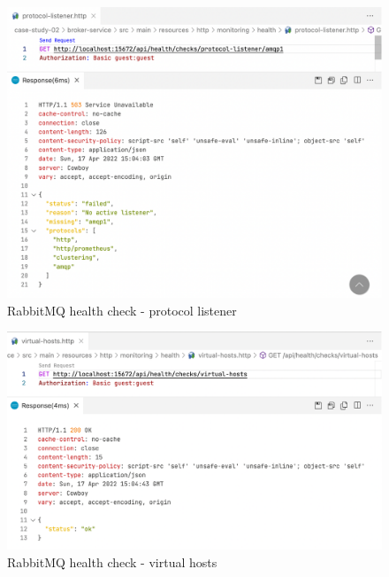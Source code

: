 \begin{figure}[H]
	\centering
	\includegraphics[width=1.0\linewidth]{./assets/images/case-studies/cs02-hc5.png}
	\caption{RabbitMQ health check - protocol listener}
	\label{fig:cs02-hc5}
\end{figure}


\begin{figure}[H]
	\centering
	\includegraphics[width=1.0\linewidth]{./assets/images/case-studies/cs02-hc6.png}
	\caption{RabbitMQ health check - virtual hosts}
	\label{fig:cs02-hc6}
\end{figure}


